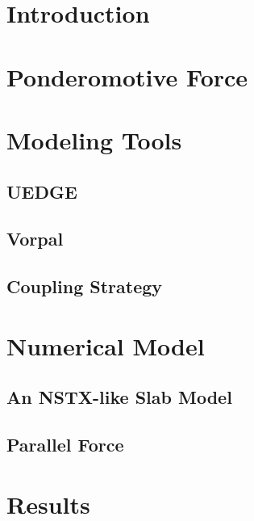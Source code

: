 \maketitle

\section{\label{sec:intro}Introduction}


\section{\label{sec:ponderomotive}Ponderomotive Force}


\section{\label{sec:modelingtools}Modeling Tools}
\subsection{\label{sec:uedge}UEDGE}

\subsection{\label{sec:vorpal}Vorpal}

\subsection{\label{sec:coupling}Coupling Strategy}


\section{\label{sec:slabmodel}Numerical Model}

\subsection{\label{sec:slab}An NSTX-like Slab Model}

\subsection{\label{sec:parallelforce}Parallel Force}


\section{\label{sec:results}Results}


